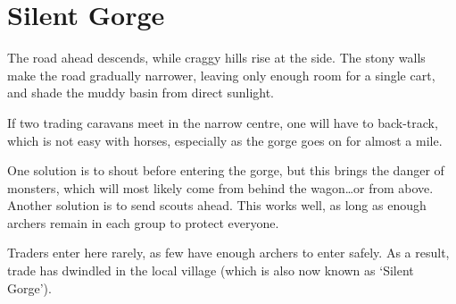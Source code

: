 \section{Silent Gorge}
\label{silentGorge}

\begin{multicols}{2}

\begin{boxtext}
  The road ahead descends, while craggy hills rise at the side.
  The stony walls make the road gradually narrower, leaving only enough room for a single cart, and shade the muddy basin from direct sunlight.
\end{boxtext}

If two trading caravans meet in the narrow centre, one will have to back-track, which is not easy with horses, especially as the gorge goes on for almost a mile.

One solution is to shout before entering the gorge, but this brings the danger of monsters, which will most likely come from behind the wagon\ldots or from above.
Another solution is to send scouts ahead.
This works well, as long as enough archers remain in each group to protect everyone.

Traders enter here rarely, as few have enough archers to enter safely.
As a result, trade has dwindled in the local \gls{village} (which is also now known as `Silent Gorge').

\end{multicols}
